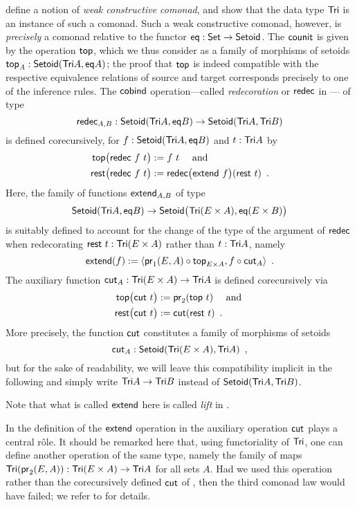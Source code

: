\documentclass[conference,10pt]{IEEEtran}
\begin{document}
\begin{example}
\noindent
\textcite{DBLP:conf/types/MatthesP11} define a notion of \emph{weak constructive comonad}, and show that the data type $\Tri$
  is an instance of such a comonad. 
  Such a weak constructive comonad, however, is \emph{precisely}
  a comonad relative to the functor $\eq : \Set\to\Setoid$.
  The $\counit$ is given by the operation $\head$, which we thus consider as a family of morphisms of setoids $\head_A : \Setoid(\Tri A, \eq A)$;
  the proof that $\head$ is indeed compatible with the respective equivalence relations of source and target corresponds
  precisely to one of the inference rules.
  The $\cobind$ operation---called \emph{redecoration} or $\redec$ in \parencite{DBLP:conf/types/MatthesP11}--- of type
   \[ \redec_{A,B} : \Setoid(\Tri A,\eq B) \to \Setoid(\Tri A,\Tri B )\] is defined 
  corecursively, for $f:\Setoid(\Tri A,\eq B)$  and $t : \Tri A$ by
      \begin{align}\head\bigl(\redec~f~t\bigr) &:= f~t \quad\text{ and } \notag\\
                     \tail\bigl(\redec~f~t\bigr) &:= \redec\bigl(\extend~f\bigr)(\tail~t) \enspace . \label{eq:rest_redec}
      \end{align}
Here, the family of functions $\extend_{A,B}$ of type
     \[\Setoid(\Tri A,\eq B) \to \Setoid\bigr(\Tri (E \times A),\eq(E\times B)\bigr)\]
  is suitably defined to account for the change of the type of the argument of $\redec$ when redecorating $\tail~t : \Tri(E\times A)$
  rather than $t : \Tri A$, namely
  \[ \extend(f) := \langle \comp{\head_{E\times A}}{\pr_1(E,A)} , \comp{\cut_A}{f} \rangle \enspace . \]
  The auxiliary function $\cut_A : \Tri(E\times A) \to \Tri A$ is defined corecursively via
   \begin{align*}\head\bigl(\cut~t\bigr) &:= \pr_2(\head~t) \quad\text{ and } \\
                     \tail\bigl(\cut~t\bigr) &:= \cut(\tail~t) \enspace . 
      \end{align*}
  More precisely, the function $\cut$ constitutes a family of morphisms of setoids \[\cut_A : \Setoid(\Tri(E\times A),\Tri A) \enspace ,\]
  but for the sake of readability, we will leave this compatibility implicit in the following and simply write $\Tri A \to \Tri B$
  instead of $\Setoid(\Tri A,\Tri B)$.
  
 Note that what is called $\extend$ here is called \textit{lift} in \parencite{DBLP:conf/types/MatthesP11}.
\end{example}

\begin{remark}\label{rem:wrong_cut}
In the definition of the $\extend$ operation in  the auxiliary operation $\cut$ plays a central r\^ole.
It should be remarked here that, using functoriality of $\Tri$, one can define another operation of the same type, namely the family of 
maps $\Tri(\pr_2(E,A)) : \Tri(E\times A) \to \Tri A$ for
all sets $A$. Had we used this operation rather than the corecursively defined $\cut$ of , 
then the third comonad law would have failed; we refer to \parencite{DBLP:conf/types/MatthesS07} for details.
\end{remark}
\end{document}
